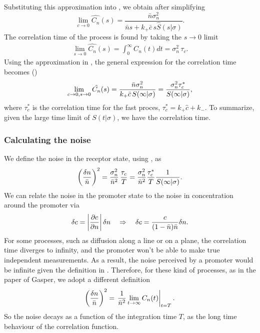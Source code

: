 Substituting this approximation into , we obtain after simplifying
\begin{equation}
 \lim_{c \rightarrow 0} \hat{C_n}(s) = \frac{\bar{n} \sigma_n^2}{\bar{n} s + k_+ \bar{c} \, s \hat{S}(s|\sigma)}.
\end{equation}
The correlation time of the process is found by taking the $s \rightarrow 0$ limit
\begin{eqnarray}
 \lim_{s \rightarrow 0} \hat{C_n}(s) = \int_0^\infty C_n(t) dt = \sigma_n^2 \, \tau_c.
\end{eqnarray}
Using the approximation in , the general expression for the correlation time becomes ()
\begin{equation}
 \lim_{c \rightarrow 0, s \rightarrow 0} \hat{C_n}(s) = \frac{\bar{n} \sigma_n^2}{k_+ \bar{c} \, S(\infty|\sigma)} = \frac{\sigma_n^2 \tau_c^*}{S(\infty|\sigma)},
 \elabel{CT1}
\end{equation}
where $\tau_c^*$ is the correlation time for the fast proces, $\tau_c^* = k_+ \hat{c} + k_-$. To summarize, given the large time limit of $S(t|\sigma)$, we have the correlation time.


\subsubsection{Calculating the noise}
We define the noise in the receptor state, using , as
\begin{equation}
 \left( \frac{\delta n}{\bar{n}} \right)^2 = \frac{\sigma_n^2}{\bar{n}^2} \, \frac{\tau_c}{T} = \frac{\sigma_n^2}{\bar{n}^2} \frac{\tau_c^*}{T} \frac{1}{S(\infty|\sigma)}.
 \elabel{EqProNoise}
\end{equation}
We can relate the noise in the promoter state to the noise in concentration around the promoter via 
\begin{equation}
 \delta c = \left|\frac{\partial c}{\partial n}\right| \delta n \quad \Rightarrow \quad  \delta c = \frac{c}{(1-\bar{n})\bar{n}}\delta n.
 \elabel{EqConNoise}
\end{equation}
For some processes, such as diffusion along a line or on a plane, the correlation time diverges to infinity, and the promoter won't be able to make true independent measurements. As a result, the noise perceived by a promoter would be infinite given the definition in . Therefore, for these kind of processes, as in the paper of Gasper, we adopt a different definition
\begin{equation}
  \left( \frac{\delta n}{\bar{n}} \right)^2 = \left. \frac{1}{\bar{n}^2} \lim_{t \rightarrow \infty} C_n(t)  \right|_{t = T}.
  \elabel{EqProNoiseII}
\end{equation}
So the noise decays as a function of the integration time $T$, as the long time behaviour of the correlation function.


